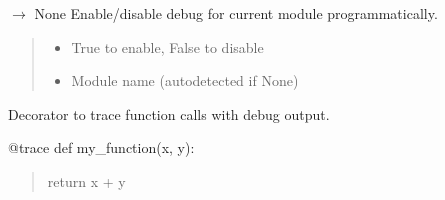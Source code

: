 \documentclass[letterpaper,10pt,english]{sphinxmanual}
\begin{document}
\begin{fulllineitems}
\label{\detokenize{core.utils.debug:core.utils.debug.set_debug}}
\pysigstartsignatures
\pysiglinewithargsret
{}
{\sphinxparamcomma {}}
{{ $\rightarrow$ None}}
\pysigstopsignatures
\sphinxAtStartPar
Enable/disable debug for current module programmatically.
\begin{quote}\begin{description}
\begin{itemize}
\item {} 
\sphinxAtStartPar
{} \textendash{} True to enable, False to disable

\item {} 
\sphinxAtStartPar
{} \textendash{} Module name (auto\sphinxhyphen{}detected if None)

\end{itemize}

\end{description}\end{quote}

\end{fulllineitems}


\begin{fulllineitems}
\label{\detokenize{core.utils.debug:core.utils.debug.trace}}
\pysigstartsignatures
\pysiglinewithargsret
{}
{}
{}
\pysigstopsignatures
\sphinxAtStartPar
Decorator to trace function calls with debug output.
\begin{description}
\sphinxAtStartPar
@trace
def my\_function(x, y):
\begin{quote}

\sphinxAtStartPar
return x + y
\end{quote}

\end{description}

\end{fulllineitems}
\end{document}
